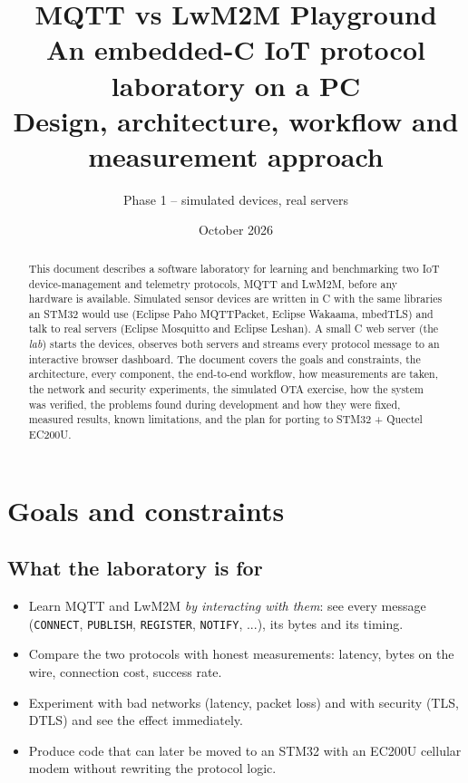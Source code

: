 \documentclass[11pt,a4paper]{article}
\title{\textbf{MQTT vs LwM2M Playground}\\[4pt]
\large An embedded-C IoT protocol laboratory on a PC\\
Design, architecture, workflow and measurement approach}
\author{Phase 1 -- simulated devices, real servers}
\date{October 2026}
\newcommand{\code}[1]{\texttt{#1}}
\begin{document}
\maketitle

\begin{abstract}
This document describes a software laboratory for learning and benchmarking
two IoT device-management and telemetry protocols, MQTT and LwM2M, before any
hardware is available. Simulated sensor devices are written in C with the same
libraries an STM32 would use (Eclipse Paho MQTTPacket, Eclipse Wakaama,
mbedTLS) and talk to real servers (Eclipse Mosquitto and Eclipse Leshan). A
small C web server (the \emph{lab}) starts the devices, observes both servers
and streams every protocol message to an interactive browser dashboard. The
document covers the goals and constraints, the architecture, every component,
the end-to-end workflow, how measurements are taken, the network and security
experiments, the simulated OTA exercise, how the system was verified, the
problems found during development and how they were fixed, measured results,
known limitations, and the plan for porting to STM32 + Quectel EC200U.
\end{abstract}

\tableofcontents
\newpage

\section{Goals and constraints}

\subsection{What the laboratory is for}
\begin{itemize}
  \item Learn MQTT and LwM2M \emph{by interacting with them}: see every
        message (\code{CONNECT}, \code{PUBLISH}, \code{REGISTER},
        \code{NOTIFY}, ...), its bytes and its timing.
  \item Compare the two protocols with honest measurements: latency, bytes on
        the wire, connection cost, success rate.
  \item Experiment with bad networks (latency, packet loss) and with security
        (TLS, DTLS) and see the effect immediately.
  \item Produce code that can later be moved to an STM32 with an EC200U
        cellular modem without rewriting the protocol logic.
\end{itemize}
\end{document}
